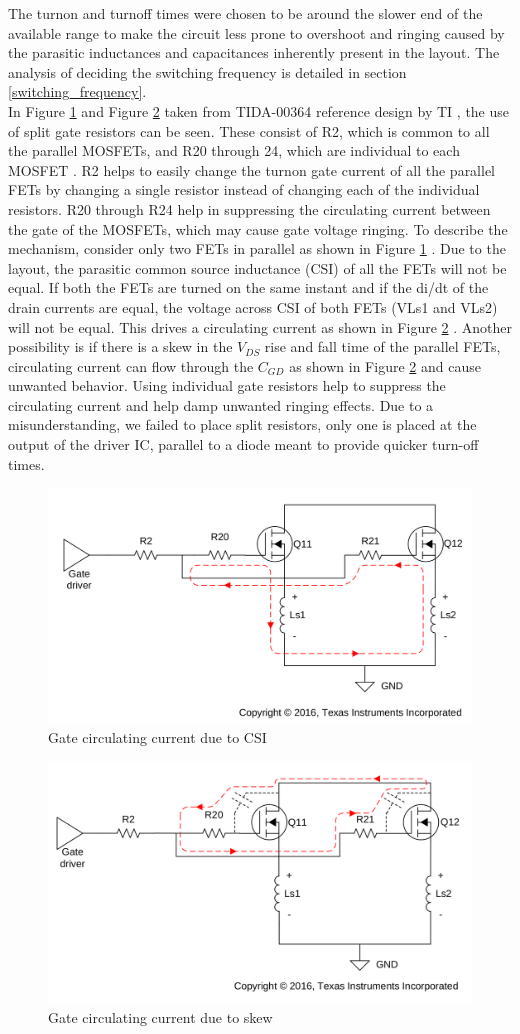 The turnon and turnoff times were chosen to be around the slower end of the available range to make the circuit less prone to overshoot and ringing caused by the parasitic inductances and capacitances inherently present in the layout. The analysis of deciding the switching frequency is detailed in section \ref{switching_frequency}. \\

In Figure \ref{fig:CSI_current} and Figure \ref{fig:skew_current} taken from TIDA-00364 reference design by TI , the use of split gate resistors can be seen. These consist of R2, which is common to all the parallel MOSFETs, and R20 through 24, which are individual to each MOSFET . R2 helps to easily change the turnon gate current of all the parallel FETs by changing a single resistor instead of changing each of the individual resistors. R20 through R24 help in suppressing the circulating current between the gate of the MOSFETs, which may cause gate voltage ringing. To describe the mechanism, consider only two FETs in parallel as shown in Figure \ref{fig:CSI_current} . Due to the layout, the parasitic common source inductance (CSI) of all the FETs will not be equal. If both the FETs are turned on the same instant and if the di/dt of the drain currents are equal, the voltage across CSI of both FETs (VLs1 and VLs2) will not be equal. This drives a circulating current as shown in Figure \ref{fig:skew_current} . Another possibility is if there is a skew in the $V_{DS}$ rise and fall time of the parallel FETs, circulating current can flow through the $C_{GD}$ as shown in Figure \ref{fig:skew_current} and cause unwanted behavior. Using individual gate resistors help to suppress the circulating current and help damp unwanted ringing effects. Due to a misunderstanding, we failed to place split resistors, only one is placed at the output of the driver IC, parallel to a diode meant to provide quicker turn-off times.

\begin{figure}[H]
	\centering
	\includegraphics[width=0.6\linewidth]{pictures/hardware/Driver_Board/CSI.png}
	\caption{Gate circulating current due to CSI}
	\label{fig:CSI_current}
\end{figure}

\begin{figure}[H]
	\centering
	\includegraphics[width=0.6\linewidth]{pictures/hardware/Driver_Board/skew.png}
	\caption{Gate circulating current due to skew}
	\label{fig:skew_current}
\end{figure}